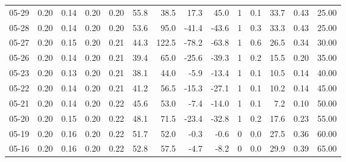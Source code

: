 \begin{threeparttable}
{\begin{tabular}{lrrrrrrrrrrrrr}
  05-29 &          0.20 &          0.14 &          0.20 &        0.20 &                55.8 &                38.5 &       17.3 &         45.0 &              1 &                 0.1 &             33.7 &            0.43 &                  25.00 \\
  05-28 &          0.20 &          0.14 &          0.20 &        0.20 &                53.6 &                95.0 &      -41.4 &        -43.6 &              1 &                 0.3 &             33.3 &            0.43 &                  25.00 \\
  05-27 &          0.20 &          0.15 &          0.20 &        0.21 &                44.3 &               122.5 &      -78.2 &        -63.8 &              1 &                 0.6 &             26.5 &            0.34 &                  30.00 \\
  05-26 &          0.20 &          0.14 &          0.20 &        0.21 &                39.4 &                65.0 &      -25.6 &        -39.3 &              1 &                 0.2 &             15.5 &            0.20 &                  35.00 \\
  05-23 &          0.20 &          0.13 &          0.20 &        0.21 &                38.1 &                44.0 &       -5.9 &        -13.4 &              1 &                 0.1 &             10.5 &            0.14 &                  40.00 \\
  05-22 &          0.20 &          0.14 &          0.20 &        0.21 &                41.2 &                56.5 &      -15.3 &        -27.1 &              1 &                 0.1 &             10.2 &            0.14 &                  45.00 \\
  05-21 &          0.20 &          0.14 &          0.20 &        0.22 &                45.6 &                53.0 &       -7.4 &        -14.0 &              1 &                 0.1 &              7.2 &            0.10 &                  50.00 \\
  05-20 &          0.20 &          0.15 &          0.20 &        0.22 &                48.1 &                71.5 &      -23.4 &        -32.8 &              1 &                 0.2 &             17.6 &            0.23 &                  55.00 \\
  05-19 &          0.20 &          0.16 &          0.20 &        0.22 &                51.7 &                52.0 &       -0.3 &         -0.6 &              0 &                 0.0 &             27.5 &            0.36 &                  60.00 \\
  05-16 &          0.20 &          0.16 &          0.20 &        0.22 &                52.8 &                57.5 &       -4.7 &         -8.2 &              0 &                 0.0 &             29.9 &            0.39 &                  65.00 \\

\end{tabular}}
\end{threeparttable}
